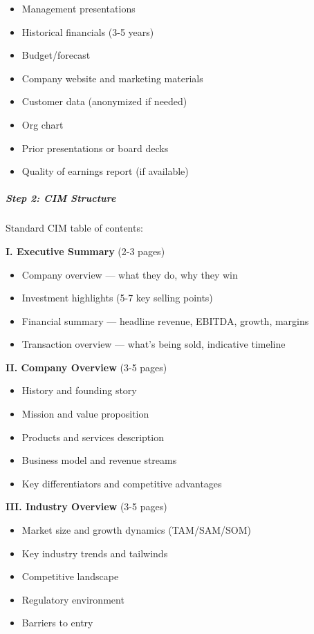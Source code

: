 \documentclass[11pt]{article}
\begin{document}
\begin{itemize}[leftmargin=*,itemsep=2pt,topsep=2pt]
\item {} Management presentations
\item {} Historical financials (3-5 years)
\item {} Budget/forecast
\item {} Company website and marketing materials
\item {} Customer data (anonymized if needed)
\item {} Org chart
\item {} Prior presentations or board decks
\item {} Quality of earnings report (if available)
\end{itemize}

\subparagraph{Step 2: CIM Structure}\mbox{}\par

Standard CIM table of contents:


\textbf{I. Executive Summary} (2-3 pages)

\begin{itemize}[leftmargin=*,itemsep=2pt,topsep=2pt]
\item {} Company overview — what they do, why they win
\item {} Investment highlights (5-7 key selling points)
\item {} Financial summary — headline revenue, EBITDA, growth, margins
\item {} Transaction overview — what's being sold, indicative timeline
\end{itemize}

\textbf{II. Company Overview} (3-5 pages)

\begin{itemize}[leftmargin=*,itemsep=2pt,topsep=2pt]
\item {} History and founding story
\item {} Mission and value proposition
\item {} Products and services description
\item {} Business model and revenue streams
\item {} Key differentiators and competitive advantages
\end{itemize}

\textbf{III. Industry Overview} (3-5 pages)

\begin{itemize}[leftmargin=*,itemsep=2pt,topsep=2pt]
\item {} Market size and growth dynamics (TAM/SAM/SOM)
\item {} Key industry trends and tailwinds
\item {} Competitive landscape
\item {} Regulatory environment
\item {} Barriers to entry
\end{itemize}
\end{document}
